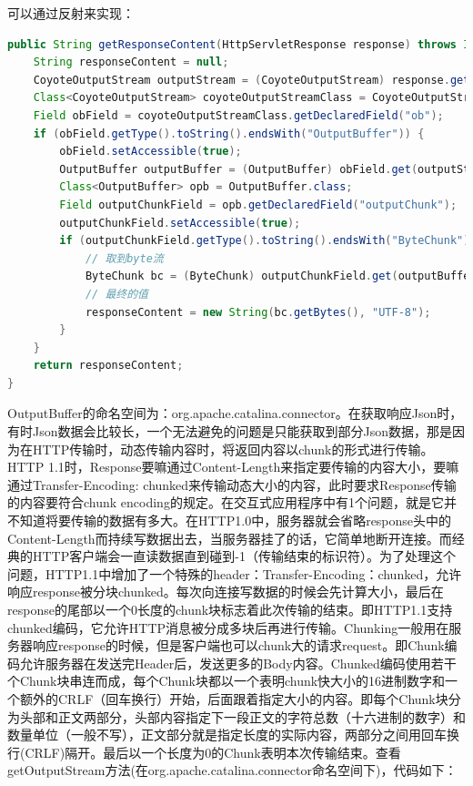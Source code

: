 \documentclass[12pt]{book}
\numberwithin{dummy}{section}
\theoremstyle{ocrenumbox}
\theoremstyle{blacknumex}
\theoremstyle{blacknumbox}
\theoremstyle{ocrenum}
\newlength\esp
\begin{document}
可以通过反射来实现：

\begin{lstlisting}[language=Java]
public String getResponseContent(HttpServletResponse response) throws IOException, NoSuchFieldException, IllegalAccessException {
	String responseContent = null;
	CoyoteOutputStream outputStream = (CoyoteOutputStream) response.getOutputStream();
	Class<CoyoteOutputStream> coyoteOutputStreamClass = CoyoteOutputStream.class;
	Field obField = coyoteOutputStreamClass.getDeclaredField("ob");
	if (obField.getType().toString().endsWith("OutputBuffer")) {
		obField.setAccessible(true);
		OutputBuffer outputBuffer = (OutputBuffer) obField.get(outputStream);
		Class<OutputBuffer> opb = OutputBuffer.class;
		Field outputChunkField = opb.getDeclaredField("outputChunk");
		outputChunkField.setAccessible(true);
		if (outputChunkField.getType().toString().endsWith("ByteChunk")) {
			// 取到byte流
			ByteChunk bc = (ByteChunk) outputChunkField.get(outputBuffer);
			// 最终的值
			responseContent = new String(bc.getBytes(), "UTF-8");
		}
	}
	return responseContent;
}
\end{lstlisting}

OutputBuffer的命名空间为：org.apache.catalina.connector。在获取响应Json时，有时Json数据会比较长，一个无法避免的问题是只能获取到部分Json数据，那是因为在HTTP传输时，动态传输内容时，将返回内容以chunk的形式进行传输。HTTP 1.1时，Response要嘛通过Content-Length来指定要传输的内容大小，要嘛通过Transfer-Encoding: chunked来传输动态大小的内容，此时要求Response传输的内容要符合chunk encoding的规定。在交互式应用程序中有1个问题，就是它并不知道将要传输的数据有多大。在HTTP1.0中，服务器就会省略response头中的Content-Length而持续写数据出去，当服务器挂了的话，它简单地断开连接。而经典的HTTP客户端会一直读数据直到碰到-1（传输结束的标识符）。为了处理这个问题，HTTP1.1中增加了一个特殊的header：Transfer-Encoding：chunked，允许响应response被分块chunked。每次向连接写数据的时候会先计算大小，最后在response的尾部以一个0长度的chunk块标志着此次传输的结束。即HTTP1.1支持chunked编码，它允许HTTP消息被分成多块后再进行传输。Chunking一般用在服务器响应response的时候，但是客户端也可以chunk大的请求request。即Chunk编码允许服务器在发送完Header后，发送更多的Body内容。Chunked编码使用若干个Chunk块串连而成，每个Chunk块都以一个表明chunk快大小的16进制数字和一个额外的CRLF（回车换行）开始，后面跟着指定大小的内容。即每个Chunk块分为头部和正文两部分，头部内容指定下一段正文的字符总数（十六进制的数字）和数量单位（一般不写），正文部分就是指定长度的实际内容，两部分之间用回车换行(CRLF)隔开。最后以一个长度为0的Chunk表明本次传输结束。查看getOutputStream方法(在org.apache.catalina.connector命名空间下)，代码如下：
\end{document}
